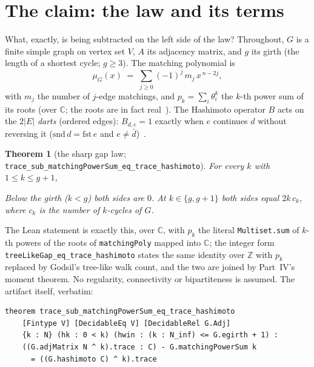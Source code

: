 \documentclass[11pt]{article}
\newtheorem{theorem}{Theorem}
\newcommand{\lean}[1]{\texttt{#1}}
\newcommand{\Z}{\mathbb{Z}}
\newcommand{\C}{\mathbb{C}}
\DeclareMathOperator{\tr}{tr}
\newcommand{\keyeq}[1]{\begin{center}\keybox{$\displaystyle #1$}\end{center}}
\begin{document}
\section{The claim: the law and its terms}
\label{sec:claim}

What, exactly, is being subtracted on the left side of the law? Throughout, $G$ is a finite
simple graph on vertex set $V$, $A$ its adjacency matrix, and $g$ its girth (the length of a shortest cycle; $g \ge 3$). The matching polynomial is
\[
\mu_G(x) \;=\; \sum_{j \ge 0} (-1)^j\, m_j\, x^{\,n-2j},
\]
with $m_j$ the number of $j$-edge matchings, and $p_k = \sum_{i} \theta_i^k$ the $k$-th power
sum of its roots (over $\C$; the roots are in fact real~\cite{HeilmannLieb1972,MarinHL2026}).
The Hashimoto operator $B$ acts on the $2|E|$ \emph{darts} (ordered edges): $B_{d,e} = 1$
exactly when $e$ continues $d$ without reversing it ($\mathrm{snd}\,d = \mathrm{fst}\,e$ and
$e \neq \bar d$)~\cite{Hashimoto1989,MarinBass2026}.

\begin{theorem}[the sharp gap law; \lean{trace\_sub\_matchingPowerSum\_eq\_trace\_hashimoto}]
\label{thm:gaplaw}
For every $k$ with $1 \le k \le g+1$,
\keyeq{\tr A^k \;-\; p_k \;=\; \tr B^k .}
Below the girth ($k < g$) both sides are $0$. At $k \in \{g, g+1\}$ both sides equal
$2k\,c_k$, where $c_k$ is the number of $k$-cycles of $G$.
\end{theorem}

The Lean statement is exactly this, over $\C$, with $p_k$ the literal
\lean{Multiset.sum} of $k$-th powers of the roots of \lean{matchingPoly} mapped into $\C$;
the integer form \lean{treeLikeGap\_eq\_trace\_hashimoto} states the same identity over $\Z$
with $p_k$ replaced by Godsil's tree-like walk count, and the two are joined by Part~IV's
moment theorem. No regularity, connectivity or bipartiteness is assumed. The artifact
itself, verbatim:
\begin{tcolorbox}[colframe=ggteal!70,colback=ggband!20,arc=3pt,boxrule=0.8pt]
\small\begin{verbatim}
theorem trace_sub_matchingPowerSum_eq_trace_hashimoto
    [Fintype V] [DecidableEq V] [DecidableRel G.Adj]
    {k : N} (hk : 0 < k) (hwin : (k : N_inf) <= G.egirth + 1) :
    ((G.adjMatrix N ^ k).trace : C) - G.matchingPowerSum k
      = ((G.hashimoto C) ^ k).trace
\end{verbatim}
\end{tcolorbox}
\end{document}
